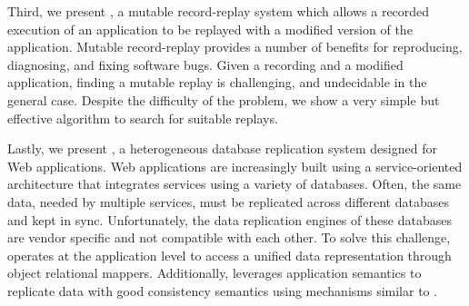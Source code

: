 Third, we present \dora, a mutable record-replay system which allows a recorded
execution of an application to be replayed with a modified version of the
application. Mutable record-replay provides a number of benefits for
reproducing, diagnosing, and fixing software bugs. Given a recording and a
modified application, finding a mutable replay is challenging, and undecidable
in the general case. Despite the difficulty of the problem, we show a very
simple but effective algorithm to search for suitable replays.

Lastly, we present \synapse, a heterogeneous database replication system
designed for Web applications. Web applications are increasingly built using a
service-oriented architecture that integrates services using a variety of
databases. Often, the same data, needed by multiple services, must be
replicated across different databases and kept in sync. Unfortunately, the data
replication engines of these databases are vendor specific and not compatible with
each other. To solve this challenge, \synapse operates at the application level
to access a unified data representation through object relational mappers.
Additionally, \synapse leverages application semantics to replicate data
with good consistency semantics using mechanisms similar to \scribe.
